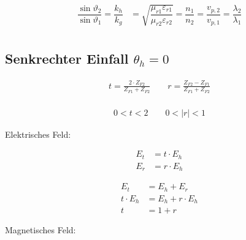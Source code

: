 \begin{align*}
    \dfrac{\sin \vartheta_{2}}{\sin \vartheta_{1}} = \dfrac{k_{h}}{k_{g}} & = \sqrt{\dfrac{\mu_{r 1} \varepsilon_{r 1}}{\mu_{r 2} \varepsilon_{r 2}}} = \dfrac{n_{1}}{n_{2}} = \dfrac{v_{p, 2}}{v_{p, 1}} = \dfrac{\lambda_{2}}{\lambda_{1}} \\
\end{align*}
\newpage
\subsection[Senkrechter Einfall]{Senkrechter Einfall $ \theta_h = 0$ }



\begin{align*}
    t  = \frac{2 \cdot Z_{F2}}{Z_{F1} + Z_{F2}}\qquad r  = \frac{Z_{F2} - Z_{F1}}{Z_{F1} + Z_{F2}} \\
\end{align*}

\begin{align*}
    0<t<2 \qquad 0<|r|<1
\end{align*}

Elektrisches Feld:


\begin{align*}
    E_t & = t \cdot E_h \\
    E_r & = r \cdot E_h
\end{align*}

\begin{align*}
    E_t          & = E_h + E_r             \\
    t\cdot E_{h} & = E_{h} + r\cdot  E_{h} \\
    t            & = 1+ r
\end{align*}

Magnetisches Feld:


